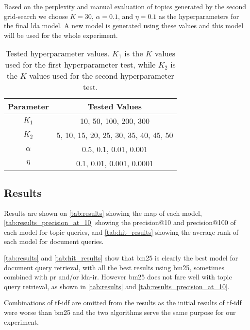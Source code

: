 Based on the perplexity and manual evaluation of topics generated by the second grid-search we choose $K = 30$, $\alpha = 0.1$, and $\eta = 0.1$ as the hyperparameters for the final \gls{lda} model.
A new model is generated using these values and this model will be used for the whole experiment.

\begin{table}[h]
	\centering
	\begin{tabular}{c|c}
		Parameter & Tested Values\\
		\hline
		$K_1$ & 10, 50, 100, 200, 300\\
		$K_2$ & 5, 10, 15, 20, 25, 30, 35, 40, 45, 50\\
		$\alpha$ & 0.5, 0.1, 0.01, 0.001\\
		$\eta$ & 0.1, 0.01, 0.001, 0.0001\\
	\end{tabular}
	\caption{Tested hyperparameter values. $K_1$ is the $K$ values used for the first hyperparameter test, while $K_2$ is the $K$ values used for the second hyperparameter test.}
	\label{tab:params}
\end{table}


\subsection{Results}\label{subsec:results}

Results are shown on \autoref{tab:results} showing the \acrlong{map} of each model, \autoref{tab:results_precision_at_10} showing the precision@10 and precision@100 of each model for topic queries, and \autoref{tab:hit_results} showing the average rank of each model for document queries.


\autoref{tab:results} and \autoref{tab:hit_results} show that \gls{bm25} is clearly the best model for document query retrieval, with all the best results using \gls{bm25}, sometimes combined with \gls{pr} and/or \gls{lda}-\gls{ir}. 
However \gls{bm25} does not fare well with topic query retrieval, as shown in \autoref{tab:results} and \autoref{tab:results_precision_at_10}.

Combinations of \gls{tf-idf} are omitted from the results as the initial results of \gls{tf-idf} were worse than \gls{bm25} and the two algorithms serve the same purpose for our experiment.


